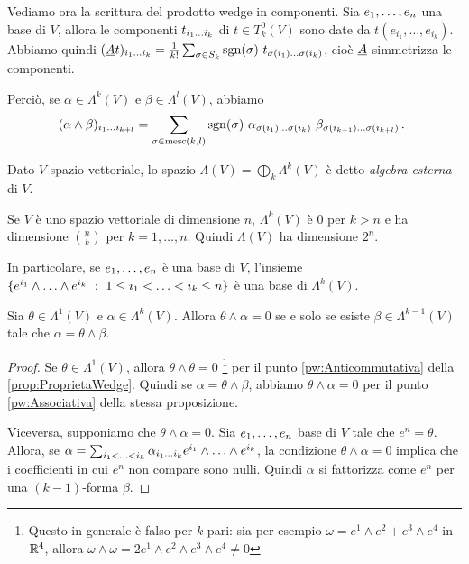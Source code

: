 Vediamo ora la scrittura del prodotto wedge in componenti.
Sia $\seqb en,$ una base di $V$, allora le componenti $t_{\seqb ik{}}$ di $t\in T^0_k(V)$ sono date da $t(e_{i_1},\ldots,e_{i_k})$.
Abbiamo quindi $(\antisimm t)_{\seqb ik{}} = \frac 1{k!} \sum_{\sigma\in S_k} \sgn(\sigma)\ t_{\sigma(i_1)\ldots\sigma(i_k)}$, cioè $\antisimm$ simmetrizza le componenti.

Perciò, se $\alpha\in\Lambda^k(V)$ e $\beta\in\Lambda^l(V)$, abbiamo
\begin{equation*}
	(\alpha\wedge\beta)_{\seqb{i}{k+l}{}} = \sum_{\sigma\in \mathrm{mesc}(k,l)} \sgn(\sigma)\ \alpha_{\sigma(i_1)\ldots\sigma(i_k)}\ \beta_{\sigma(i_{k+1})\ldots\sigma(i_{k+l})} \punto
\end{equation*}

\begin{definition} 
	Dato $V$ spazio vettoriale, lo spazio $\Lambda(V)=\bigoplus_k\Lambda^k(V)$ è detto \emph{algebra esterna} di $V$.
\end{definition}

\begin{proposition}
	Se $V$ è uno spazio vettoriale di dimensione $n$, $\Lambda^k(V)$ è 0 per $k>n$ e ha dimensione $\binom nk$ per $k=1,\ldots,n$. Quindi $\Lambda(V)$ ha dimensione $2^n$.
	
	In particolare, se $\seqb en,$ è una base di $V$, l'insieme $\{ e^{i_1}\wedge\ldots\wedge e^{i_k} \suchthat 1\le i_1< \ldots < i_k\le n\}$ è una base di $\Lambda^k(V)$.
\end{proposition}

\begin{corollary}
	Sia $\theta\in\Lambda^1(V)$ e $\alpha\in\Lambda^k(V)$. Allora $\theta\wedge\alpha=0$ se e solo se esiste $\beta\in\Lambda^{k-1}(V)$ tale che $\alpha = \theta \wedge \beta$.
\end{corollary}
\begin{proof}
	Se $\theta\in\Lambda^1(V)$, allora $\theta\wedge\theta=0$ \footnote{Questo in generale è falso per $k$ pari: sia per esempio $\omega=e^1\wedge e^2+e^3\wedge e^4$ in $\R^4$, allora $\omega\wedge\omega = 2e^1\wedge e^2 \wedge e^3\wedge e^4 \not=0$} per il punto \ref{pw:Anticommutativa} della \cref{prop:ProprietaWedge}.
	Quindi se $\alpha=\theta\wedge\beta$, abbiamo $\theta\wedge\alpha=0$ per il punto \ref{pw:Associativa} della stessa proposizione.
	
	Viceversa, supponiamo che $\theta\wedge\alpha=0$. Sia $\seqb en,$ base di $V$ tale che $e^n=\theta$. Allora, se $\alpha=\sum_{i_1<\ldots<i_k} \alpha_{\seqb ik{}} e^{i_1}\wedge\ldots\wedge e^{i_k}$, la condizione $\theta\wedge\alpha=0$ implica che i coefficienti in cui $e^n$ non compare sono nulli. Quindi $\alpha$ si fattorizza come $e^n$ per una $(k-1)$-forma $\beta$.
\end{proof}

